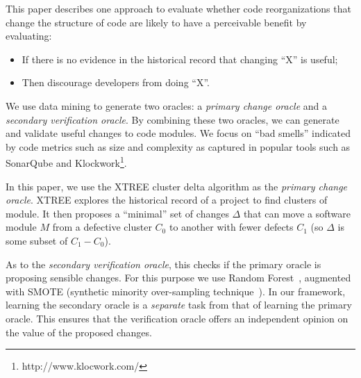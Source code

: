 \documentclass[twocolumn,5p]{elsarticle}
\newcommand{\bi}{\begin{itemize}[leftmargin=0.4cm]}
\newcommand{\ei}{\end{itemize}}
\theoremstyle{break}
\begin{document}
	This paper describes one approach to evaluate whether code reorganizations that change the structure of code are likely to have a perceivable benefit by evaluating:
	\bi
	\item If there is no evidence in the historical record that changing ``X'' is useful;
	\item Then discourage developers from doing ``X''.
	\ei
	We use data mining to generate two oracles: a {\em primary
		change oracle} and a {\em secondary verification oracle}.
	By combining these two oracles,
	we can generate and validate useful
	changes to code modules. We focus on ``bad smells'' indicated by code metrics such as size and complexity as captured in popular tools such as SonarQube and Klockwork\footnote{http://www.klocwork.com/}.
	
	In this paper, we use 
	the XTREE cluster delta algorithm as the {\em primary change  oracle}.
	XTREE 
	explores the historical record of a project to find clusters of module.
	It then proposes a ``minimal'' set of changes $\Delta$ that can move a software module $M$ from a defective cluster $C_0$ to another with fewer defects $C_1$ (so $\Delta$
	is some subset of $C_1 - C_0$). %
	
	As to 
	the {\em secondary verification oracle}, this  checks if the primary oracle is proposing
	sensible changes. For this purpose we use Random Forest~\cite{breiman2001random}, augmented with SMOTE (synthetic  minority over-sampling technique~\cite{chawla2002smote}).
	In our framework,  learning
	the secondary oracle is   a {\em separate} task from that of learning the primary
	oracle. This  ensures that the verification oracle offers an independent
	opinion on the value of the proposed changes.
	
\end{document}
